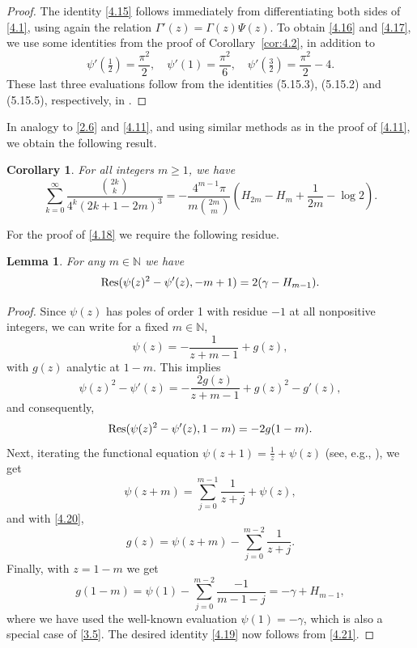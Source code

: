 \documentclass{amsart}
\newtheorem{lemma}[theorem]{Lemma}
\newtheorem{corollary}[theorem]{Corollary}
\theoremstyle{definition}
\theoremstyle{remark}
\numberwithin{equation}{section}
\begin{document}
\begin{proof}
The identity \eqref{4.15} follows immediately from differentiating both sides
of \eqref{4.1}, using again the relation $\Gamma'(z)=\Gamma(z)\Psi(z)$. To
obtain \eqref{4.16} and \eqref{4.17}, we use some identities from the proof of
Corollary~\ref{cor:4.2}, in addition to 
\[
\psi'(\tfrac{1}{2})=\frac{\pi^2}{2},\quad
\psi'(1)=\frac{\pi^2}{6},\quad
\psi'(\tfrac{3}{2})=\frac{\pi^2}{2}-4.
\]
These last three evaluations follow from the identities (5.15.3), (5.15.2)
and (5.15.5), respectively, in \cite{DLMF}.
\end{proof}

In analogy to \eqref{2.6} and \eqref{4.11}, and using similar methods as in
the proof of \eqref{4.11}, we obtain the following result.

\begin{corollary}\label{cor:4.5}
For all integers $m\geq 1$, we have
\begin{equation}\label{4.18}
\sum_{k=0}^\infty\frac{\binom{2k}{k}}{4^k(2k+1-2m)^3}
=-\frac{4^{m-1}\pi}{m\binom{2m}{m}}\left(H_{2m}-H_m+\frac{1}{2m}-\log{2}\right).
\end{equation}
\end{corollary}

For the proof of \eqref{4.18} we require the following residue.

\begin{lemma}\label{lem:4.6}
For any $m\in{\mathbb N}$ we have
\begin{equation}\label{4.19}
{\rm Res}(\psi(z)^2-\psi'(z),-m+1) = 2(\gamma-H_{m-1}).
\end{equation}
\end{lemma}

\begin{proof}
Since $\psi(z)$ has poles of order 1 with residue $-1$ at all nonpositive 
integers, we can write for a fixed $m\in{\mathbb N}$,
\begin{equation}\label{4.20}
\psi(z) = -\frac{1}{z+m-1}+g(z),
\end{equation}
with $g(z)$ analytic at $1-m$. This implies
\[
\psi(z)^2-\psi'(z) = -\frac{2g(z)}{z+m-1}+g(z)^2-g'(z),
\]
and consequently,
\begin{equation}\label{4.21}
{\rm Res}(\psi(z)^2-\psi'(z),1-m) = -2g(1-m).
\end{equation}
Next, iterating the functional equation $\psi(z+1)=\frac{1}{z}+\psi(z)$ (see,
e.g., \cite[eq.~(5.5.2)]{DLMF}), we get
\[
\psi(z+m) = \sum_{j=0}^{m-1}\frac{1}{z+j} + \psi(z),
\]
and with \eqref{4.20},
\[
g(z)=\psi(z+m) - \sum_{j=0}^{m-2}\frac{1}{z+j}.
\]
Finally, with $z=1-m$ we get
\[
g(1-m)=\psi(1) - \sum_{j=0}^{m-2}\frac{-1}{m-1-j} = -\gamma+H_{m-1},
\]
where we have used the well-known evaluation $\psi(1)=-\gamma$, which is also a
special case of \eqref{3.5}. The desired identity \eqref{4.19} now follows
from \eqref{4.21}.
\end{proof}
\end{document}

